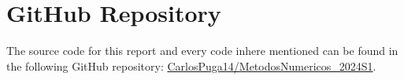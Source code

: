 \section{GitHub Repository}\label{sec:github}
 The source code for this report and every code inhere mentioned can be found in the following GitHub repository: \href{https://github.com/CarlosPuga14/MetodosNumericos_2024S1}{CarlosPuga14/MetodosNumericos\_2024S1}.

